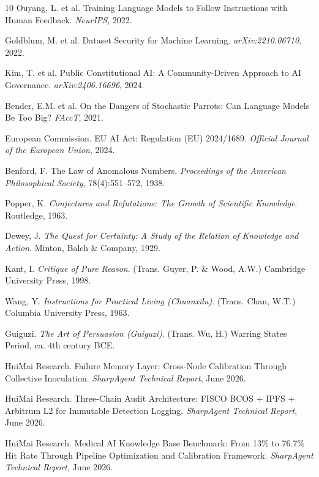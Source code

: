 \documentclass[11pt]{article}
\begin{document}
\begin{thebibliography}{10}
Ouyang, L. et al. Training Language Models to Follow Instructions with Human Feedback. \textit{NeurIPS}, 2022.

Goldblum, M. et al. Dataset Security for Machine Learning. \textit{arXiv:2210.06710}, 2022.

Kim, T. et al. Public Constitutional AI: A Community-Driven Approach to AI Governance. \textit{arXiv:2406.16696}, 2024.

Bender, E.M. et al. On the Dangers of Stochastic Parrots: Can Language Models Be Too Big? \textit{FAccT}, 2021.

European Commission. EU AI Act: Regulation (EU) 2024/1689. \textit{Official Journal of the European Union}, 2024.

Benford, F. The Law of Anomalous Numbers. \textit{Proceedings of the American Philosophical Society}, 78(4):551--572, 1938.

Popper, K. \textit{Conjectures and Refutations: The Growth of Scientific Knowledge}. Routledge, 1963.

Dewey, J. \textit{The Quest for Certainty: A Study of the Relation of Knowledge and Action}. Minton, Balch \& Company, 1929.

Kant, I. \textit{Critique of Pure Reason}. (Trans. Guyer, P. \& Wood, A.W.) Cambridge University Press, 1998.

Wang, Y. \textit{Instructions for Practical Living (Chuanxilu)}. (Trans. Chan, W.T.) Columbia University Press, 1963.

Guiguzi. \textit{The Art of Persuasion (Guiguzi)}. (Trans. Wu, H.) Warring States Period, ca. 4th century BCE.

HuiMai Research. Failure Memory Layer: Cross-Node Calibration Through Collective Inoculation.
\textit{SharpAgent Technical Report}, June 2026.

HuiMai Research. Three-Chain Audit Architecture: FISCO BCOS + IPFS + Arbitrum L2 for
Immutable Detection Logging. \textit{SharpAgent Technical Report}, June 2026.

HuiMai Research. Medical AI Knowledge Base Benchmark: From 13\% to 76.7\% Hit Rate
Through Pipeline Optimization and Calibration Framework. \textit{SharpAgent Technical Report}, June 2026.

\end{thebibliography}
\end{document}
